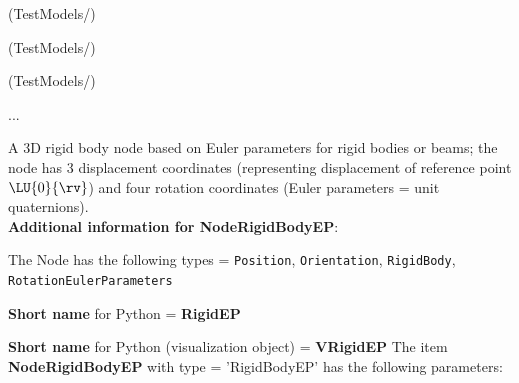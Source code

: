 \item {} (TestModels/)
\item {} (TestModels/)
\item {} (TestModels/)
\item  ...

\ei

%
\newpage

\label{sec:item:NodeRigidBodyEP}
A 3D rigid body node based on Euler parameters for rigid bodies or beams; the node has 3 displacement coordinates (representing displacement of reference point $\LU{0}{\rv}$) and four rotation coordinates (Euler parameters = unit quaternions).\vspace{12pt}
 \\{\bf Additional information for NodeRigidBodyEP}:
\bi
  \item The Node has the following types = \texttt{Position}, \texttt{Orientation}, \texttt{RigidBody}, \texttt{RotationEulerParameters}
  \item {\bf Short name} for Python = {\bf RigidEP}  \item {\bf Short name} for Python (visualization object) = {\bf VRigidEP}\ei
\vspace{12pt} \noindent The item {\bf NodeRigidBodyEP} with type = 'RigidBodyEP' has the following parameters:\vspace{-1cm}\\ 

